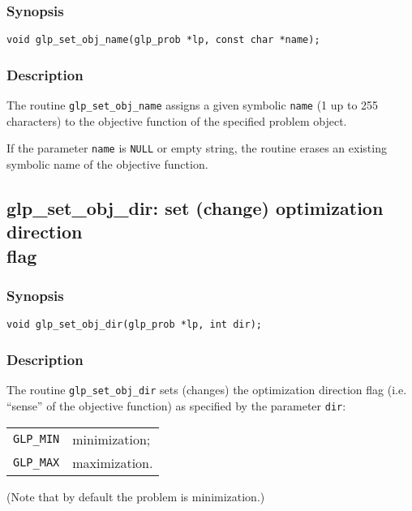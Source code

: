\subsubsection*{Synopsis}

\begin{verbatim}
void glp_set_obj_name(glp_prob *lp, const char *name);
\end{verbatim}

\subsubsection*{Description}

The routine \verb|glp_set_obj_name| assigns a given symbolic
\verb|name| (1 up to 255 characters) to the objective function of the
specified problem object.

If the parameter \verb|name| is \verb|NULL| or empty string, the routine
erases an existing symbolic name of the objective function.

\subsection{glp\_set\_obj\_dir: set (change) optimization direction\\
flag}

\subsubsection*{Synopsis}

\begin{verbatim}
void glp_set_obj_dir(glp_prob *lp, int dir);
\end{verbatim}

\subsubsection*{Description}

The routine \verb|glp_set_obj_dir| sets (changes) the optimization
direction flag (i.e. ``sense'' of the objective function) as specified
by the parameter \verb|dir|:

\begin{tabular}{@{}ll}
\verb|GLP_MIN| & minimization; \\
\verb|GLP_MAX| & maximization. \\
\end{tabular}

\noindent
(Note that by default the problem is minimization.)

